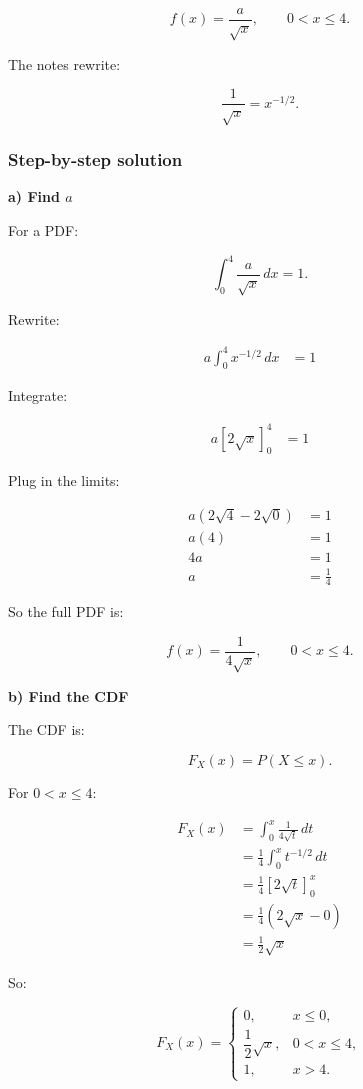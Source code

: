 \documentclass[10pt]{article}
\begin{document}
\[
f(x)=
\frac{a}{\sqrt{x}},
\qquad 0<x\leq 4.
\]

The notes rewrite:

\[
\frac{1}{\sqrt{x}}=x^{-1/2}.
\]

\subsubsection*{Step-by-step solution}

\textbf{a) Find $a$}

For a PDF:

\[
\int_0^4 \frac{a}{\sqrt{x}}\,dx=1.
\]

Rewrite:

\begin{align*}
a\int_0^4 x^{-1/2}\,dx
&=1
\end{align*}

Integrate:

\begin{align*}
a\left[
2\sqrt{x}
\right]_0^4
&=1
\end{align*}

Plug in the limits:

\begin{align*}
a(2\sqrt{4}-2\sqrt{0})
&=1 \\[2mm]
a(4)
&=1 \\[2mm]
4a
&=1 \\[2mm]
a
&=\frac{1}{4}
\end{align*}

So the full PDF is:

\[
f(x)=\frac{1}{4\sqrt{x}},
\qquad 0<x\leq 4.
\]

\textbf{b) Find the CDF}

The CDF is:

\[
F_X(x)=P(X\leq x).
\]

For $0<x\leq 4$:

\begin{align*}
F_X(x)
&=
\int_0^x
\frac{1}{4\sqrt{t}}\,dt \\[2mm]
&=
\frac{1}{4}
\int_0^x
t^{-1/2}\,dt \\[2mm]
&=
\frac{1}{4}
\left[
2\sqrt{t}
\right]_0^x \\[2mm]
&=
\frac{1}{4}
(2\sqrt{x}-0) \\[2mm]
&=
\frac{1}{2}\sqrt{x}
\end{align*}

So:

\[
F_X(x)=
\begin{cases}
0,
& x\leq 0,\\
\dfrac{1}{2}\sqrt{x},
& 0<x\leq 4,\\
1,
& x>4.
\end{cases}
\]
\end{document}
